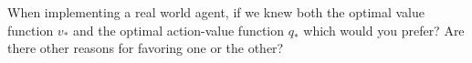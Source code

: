When implementing a real world agent, if we knew both
the optimal value function
$v_{\ast}$ and the optimal action-value function $q_\ast$
which would you prefer? Are there other reasons for favoring one
or the other?

\smallspace
